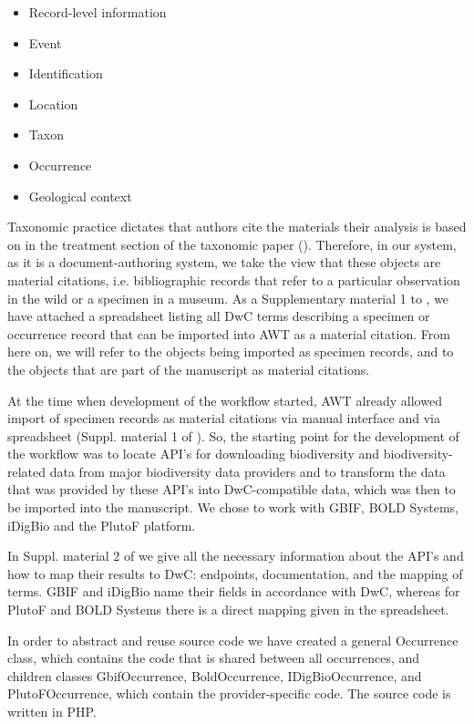 \begin{itemize}
\item{Record-level information}
\item{Event}
\item{Identification}
\item{Location}
\item{Taxon}
\item{Occurrence}
\item{Geological context}
\end{itemize}

Taxonomic practice dictates that authors cite the materials their analysis is based on in the treatment section of the taxonomic paper (\cite{catapano_taxpub:_2010}). Therefore, in our system, as it is a document-authoring system, we take the view that these objects are material citations, i.e. bibliographic records that refer to a particular observation in the wild or a specimen in a museum. As a Supplementary material 1 to \cite{senderov_online_2016}, we have attached a spreadsheet listing all DwC terms describing a specimen or occurrence record that can be imported into AWT as a material citation. From here on, we will refer to the objects being imported as specimen records, and to the objects that are part of the manuscript as material citations.

At the time when development of the workflow started, AWT already allowed import of specimen records as material citations via manual interface and via spreadsheet (Suppl. material 1 of \cite{senderov_online_2016}). So, the starting point for the development of the workflow was to locate API's for downloading biodiversity and biodiversity-related data from major biodiversity data providers and to transform the data that was provided by these API's into DwC-compatible data, which was then to be imported into the manuscript. We chose to work with GBIF, BOLD Systems, iDigBio and the PlutoF platform.

In Suppl. material 2 of \cite{senderov_online_2016} we give all the necessary information about the API's and how to map their results to DwC: endpoints, documentation, and the mapping of terms. GBIF and iDigBio name their fields in accordance with DwC, whereas for PlutoF and BOLD Systems there is a direct mapping given in the spreadsheet.

In order to abstract and reuse source code we have created a general Occurrence class, which contains the code that is shared between all occurrences, and children classes GbifOccurrence, BoldOccurrence, IDigBioOccurrence, and PlutoFOccurrence, which contain the provider-specific code. The source code is written in PHP.

